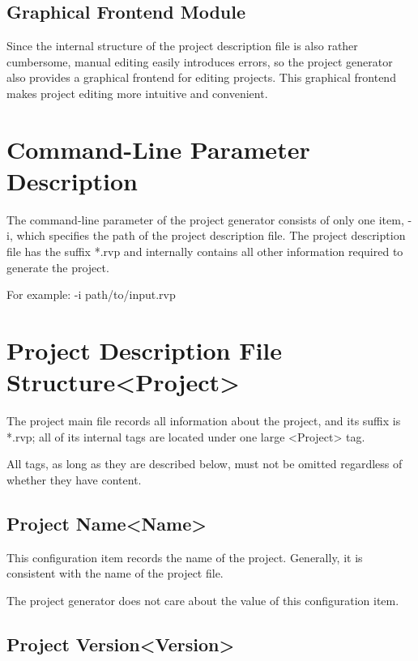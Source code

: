 \subsection{Graphical Frontend Module}\label{subsec:5-1-4}

Since the internal structure of the project description file is also rather cumbersome, manual editing easily introduces errors, so the project generator also provides a graphical frontend for editing projects. This graphical frontend makes project editing more intuitive and convenient.


\section{Command-Line Parameter Description}\label{sec:5-2}

The command-line parameter of the project generator consists of only one item, -i, which specifies the path of the project description file. The project description file has the suffix *.rvp and internally contains all other information required to generate the project.

For example: -i path/to/input.rvp

\section{Project Description File Structure<Project>{}}\label{sec:5-3}

The project main file records all information about the project, and its suffix is *.rvp; all of its internal tags are located under one large <Project>{} tag.

All tags, as long as they are described below, must not be omitted regardless of whether they have content.

\subsection{Project Name<Name>{}}\label{subsec:5-3-1}

This configuration item records the name of the project. Generally, it is consistent with the name of the project file.

The project generator does not care about the value of this configuration item.

\subsection{Project Version<Version>{}}\label{subsec:5-3-2}

